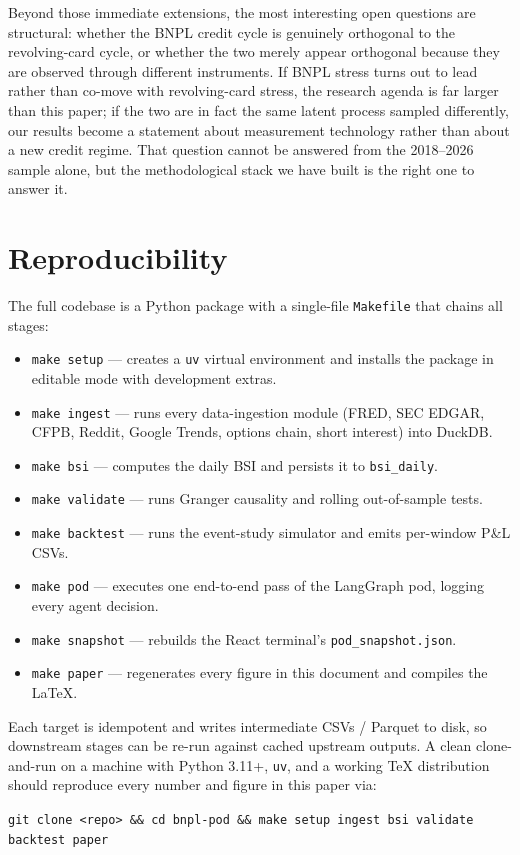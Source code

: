 \documentclass[11pt,letterpaper]{article}
\begin{document}
Beyond those immediate extensions, the most interesting open
questions are structural: whether the BNPL credit cycle is
genuinely orthogonal to the revolving-card cycle, or whether the
two merely appear orthogonal because they are observed through
different instruments. If BNPL stress turns out to lead rather
than co-move with revolving-card stress, the research agenda is
far larger than this paper; if the two are in fact the same latent
process sampled differently, our results become a statement about
measurement technology rather than about a new credit regime. That
question cannot be answered from the 2018--2026 sample alone, but
the methodological stack we have built is the right one to answer
it.





\appendix
\section{Reproducibility}
\label{app:repro}

The full codebase is a Python package with a single-file
\texttt{Makefile} that chains all stages:

\begin{itemize}[leftmargin=2em,noitemsep]
\item \texttt{make setup} --- creates a \texttt{uv} virtual
environment and installs the package in editable mode with
development extras.
\item \texttt{make ingest} --- runs every data-ingestion module
(FRED, SEC EDGAR, CFPB, Reddit, Google Trends, options chain,
short interest) into DuckDB.
\item \texttt{make bsi} --- computes the daily BSI and persists
it to \texttt{bsi\_daily}.
\item \texttt{make validate} --- runs Granger causality and
rolling out-of-sample tests.
\item \texttt{make backtest} --- runs the event-study simulator
and emits per-window P\&L CSVs.
\item \texttt{make pod} --- executes one end-to-end pass of the
LangGraph pod, logging every agent decision.
\item \texttt{make snapshot} --- rebuilds the React terminal's
\texttt{pod\_snapshot.json}.
\item \texttt{make paper} --- regenerates every figure in this
document and compiles the LaTeX.
\end{itemize}

Each target is idempotent and writes intermediate CSVs / Parquet
to disk, so downstream stages can be re-run against cached
upstream outputs. A clean clone-and-run on a machine with Python
3.11+, \texttt{uv}, and a working \TeX{} distribution should
reproduce every number and figure in this paper via:
\begin{center}
\texttt{git clone <repo> \&\& cd bnpl-pod \&\& make setup ingest bsi validate backtest paper}
\end{center}
\end{document}
